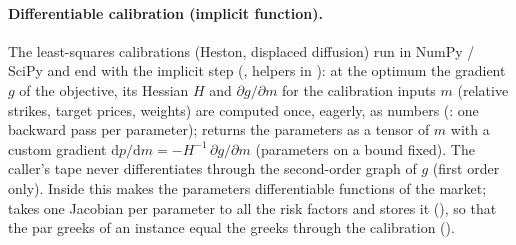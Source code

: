 \paragraph{Differentiable calibration (implicit function).} The least-squares calibrations (Heston, displaced diffusion) run in NumPy / SciPy and end with the implicit step
(, helpers in ): at the optimum the gradient $g$ of the
objective, its Hessian $H$ and $\partial g/\partial m$ for the calibration inputs $m$ (relative strikes, target prices,
weights) are computed once, eagerly, as numbers (: one backward pass per parameter);
 returns the parameters as a tensor of $m$ with a custom gradient
$\mathrm{d}p/\mathrm{d}m = -H^{-1}\,\partial g/\partial m$ (parameters on a bound fixed). The caller's tape never
differentiates through the second-order graph of $g$ (first order only). Inside  this makes the
parameters differentiable functions of the market;  takes one Jacobian per parameter to all the risk
factors and stores it (), so that the par greeks of an instance equal the greeks through the
calibration ().

